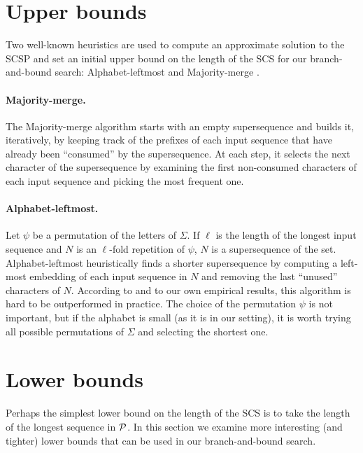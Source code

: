 \section{Upper bounds}
\label{sec:scs_ubound}

Two well-known heuristics are used to compute an approximate solution to the
SCSP and set an initial upper bound on the length of the SCS for our
branch-and-bound search: Alphabet-leftmost and Majority-merge
\citep[see][]{Fraser1995a,Jiang1995,Rahmann2003}.

\paragraph{Majority-merge.} The Majority-merge algorithm starts with an empty
supersequence and builds it, iteratively, by keeping track of the prefixes of
each input sequence that have already been ``consumed'' by the supersequence. At
each step, it selects the next character of the supersequence by examining the
first non-consumed characters of each input sequence and picking the most
frequent one.

\paragraph{Alphabet-leftmost.} Let $\psi$ be a permutation of the letters of
$\Sigma$. If $\ell$ is the length of the longest input sequence and $N$ is an
$\ell$-fold repetition of $\psi$, $N$ is a supersequence of the set.
Alphabet-leftmost heuristically finds a shorter supersequence by computing a
left-most embedding of each input sequence in $N$ and removing the last
``unused'' characters of $N$. According to \citet{Rahmann2003} and to our own
empirical results, this algorithm is hard to be outperformed in practice. The
choice of the permutation $\psi$ is not important, but if the alphabet is small
(as it is in our setting), it is worth trying all possible permutations of
$\Sigma$ and selecting the shortest one.

\section{Lower bounds}
\label{sec:scs_lbound}

Perhaps the simplest lower bound on the length of the SCS is to take the length
of the longest sequence in ${\mathcal{P}}$. In this section we examine more interesting
(and tighter) lower bounds that can be used in our branch-and-bound search.


